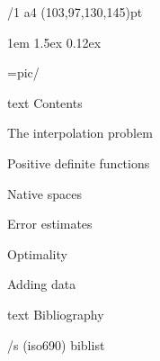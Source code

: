 \useOpTeX  %


\hyperlinks \Black \Black
{}

\enlang
\fontfam[BaskervilleMT]\load[patches]\let\semibold\bf %
{}%

\def\QED{\hbox{$\Bm{\Umathchar"0"01"00203B}$}}

\margins/1 a4 (103,97,130,145)pt

\typosize[11.9/14.1]
\parindent 1em
\parskip 1.5ex
 0.12ex

\picdir={pic/}


\bgroup
\let\_mtext\ignoreit
\nonum\notoc\chap Contents
\egroup
\tocpage


\sec The interpolation problem


\sec Positive definite functions


\sec Native spaces


\sec[errorsec] Error estimates


\sec Optimality


\sec[addingsec] Adding data







\bgroup
\let\_mtext\ignoreit
\nonum\chap Bibliography

\def\_opwarning#1{}
\usebib/s (iso690) biblist
\egroup

\bye
